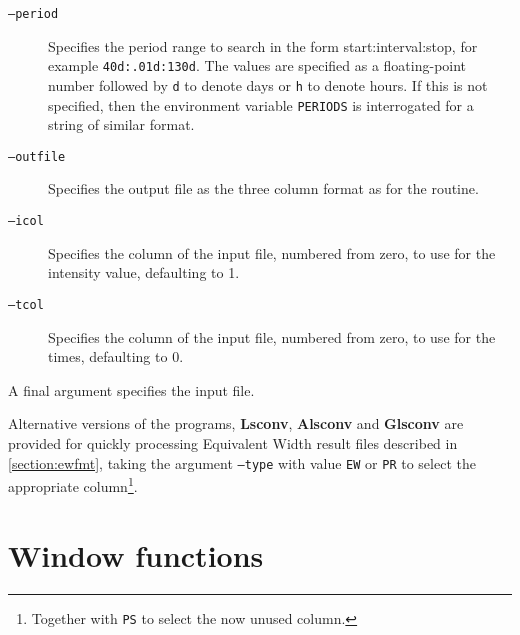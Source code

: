 \begin{description}

\item[\tt{--period}] Specifies the period range to search in the form start:interval:stop, for example
  \texttt{40d:.01d:130d}. The values are specified as a floating-point number followed by \texttt{d} to denote days or \texttt{h} to
  denote hours. If this is not specified, then the environment variable \texttt{PERIODS} is interrogated for a string of
  similar format.

\item[\tt{--outfile}] Specifies the output file as the three column format as for the {\numrecs} routine.

\item[\tt{--icol}] Specifies the column of the input file, numbered from zero, to use for the intensity value, defaulting to
  1.

\item[\tt{--tcol}] Specifies the column of the input file, numbered from zero, to use for the times, defaulting to 0.

\end{description}

A final argument specifies the input file.

Alternative versions of the programs, \textbf{Lsconv}, \textbf{Alsconv} and \textbf{Glsconv} are provided for quickly
processing Equivalent Width result files described in \ref{section:ewfmt}, taking the argument \texttt{--type} with value \texttt{EW} or \texttt{PR} to
select the appropriate column\footnote{Together with \texttt{PS} to select the now unused column.}.

\section{Window functions}


